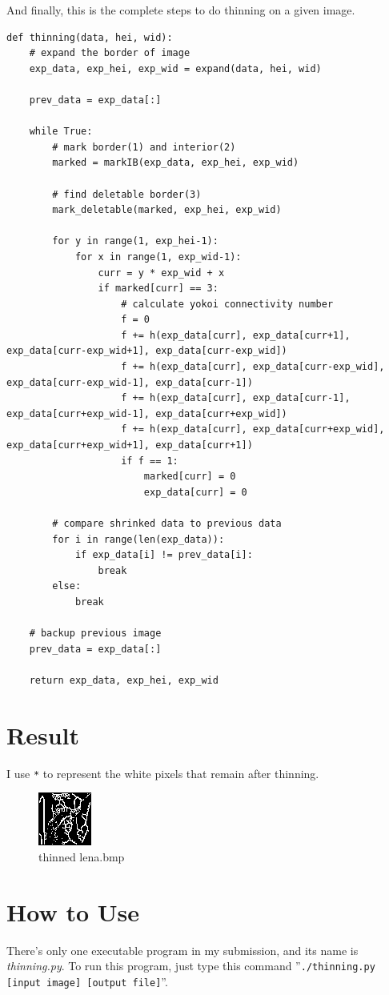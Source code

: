 \documentclass[14pt,a4paper]{extarticle}
\begin{document}
And finally, this is the complete steps to do thinning on a given image.
\begin{lstlisting}
def thinning(data, hei, wid):
	# expand the border of image
	exp_data, exp_hei, exp_wid = expand(data, hei, wid)

	prev_data = exp_data[:]

	while True:
		# mark border(1) and interior(2)
		marked = markIB(exp_data, exp_hei, exp_wid)

		# find deletable border(3)
		mark_deletable(marked, exp_hei, exp_wid)

		for y in range(1, exp_hei-1):
			for x in range(1, exp_wid-1):
				curr = y * exp_wid + x
				if marked[curr] == 3:
					# calculate yokoi connectivity number
					f = 0
					f += h(exp_data[curr], exp_data[curr+1], exp_data[curr-exp_wid+1], exp_data[curr-exp_wid])
					f += h(exp_data[curr], exp_data[curr-exp_wid], exp_data[curr-exp_wid-1], exp_data[curr-1])
					f += h(exp_data[curr], exp_data[curr-1], exp_data[curr+exp_wid-1], exp_data[curr+exp_wid])
					f += h(exp_data[curr], exp_data[curr+exp_wid], exp_data[curr+exp_wid+1], exp_data[curr+1])
					if f == 1:
						marked[curr] = 0
						exp_data[curr] = 0

		# compare shrinked data to previous data
		for i in range(len(exp_data)):
			if exp_data[i] != prev_data[i]:
				break
		else:
			break

	# backup previous image
	prev_data = exp_data[:]

	return exp_data, exp_hei, exp_wid
\end{lstlisting}

\section*{Result}

I use \texttt{*} to represent the white pixels that remain after thinning.


\begin{figure}[H]
\centering
\includegraphics[scale=4]{thinned-lena.bmp}
\caption{thinned lena.bmp}
\label{fig:thinned-lena.bmp}
\end{figure}

\section*{How to Use}

There's only one executable program in my submission, and its name is \textit{thinning.py}. To run this program, just type this command ''\texttt{./thinning.py [input image] [output file]}''.
\end{document}

